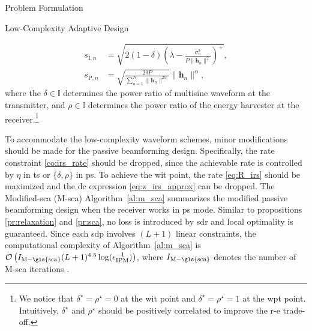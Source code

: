 \begin{section}{Problem Formulation}
\begin{subsection}{Low-Complexity Adaptive Design}
\begin{itemize}
\begin{align}
				s_{\mathrm{I}, n} &= \sqrt{2(1 - \delta)\left(\lambda - \frac{\sigma_n^2}{P \lVert{\mathbf{h}_n}\rVert^2}\right)^+}, \label{eq:s_i}\\
				s_{\mathrm{P}, n} &= \sqrt{\frac{2 \delta P}{\sum_{n=1}^N \lVert{\mathbf{h}_n \rVert^{2 \alpha}}}}\lVert{\mathbf{h}_n}\rVert^\alpha, \label{eq:s_p}
			\end{align}
			where the $\delta \in \mathbb{I}$ determines the power ratio of multisine waveform at the transmitter, and $\rho \in \mathbb{I}$ determines the power ratio of the energy harvester at the receiver.\footnote{We notice that $\delta^{\star}=\rho^{\star}=0$ at the \gls{wit} point and $\delta^{\star}=\rho^{\star}=1$ at the \gls{wpt} point. Intuitively, $\delta^{\star}$ and $\rho^{\star}$ should be positively correlated to improve the \gls{r-e} trade-off.}
		\end{itemize}

		To accommodate the low-complexity waveform schemes, minor modifications should be made for the passive beamforming design.
		Specifically, the rate constraint \eqref{co:irs_rate} should be dropped, since the achievable rate is controlled by $\eta$ in \gls{ts} or $\{\delta,\rho\}$ in \gls{ps}.
		To achieve the \gls{wit} point, the rate \eqref{eq:R_irs} should be maximized and the \gls{dc} expression \eqref{eq:z_irs_approx} can be dropped. The Modified-\gls{sca} (M-\gls{sca}) Algorithm~\ref{al:m_sca} summarizes the modified passive beamforming design when the receiver works in \gls{ps} mode.
		Similar to propositions \ref{pr:relaxation} and \ref{pr:sca}, no loss is introduced by \gls{sdr} and local optimality is guaranteed. Since each \gls{sdp} involves $(L+1)$ linear constraints, the computational complexity of Algorithm~\ref{al:m_sca} is $\mathcal{O}\left(I_{\mathrm{M-\gls{sca}}}(L+1)^{4.5} \log(\epsilon_{\mathrm{IPM}}^{-1})\right)$, where $I_{\mathrm{M-\gls{sca}}}$ denotes the number of M-\gls{sca} iterations \cite{Luo2010b}.


\end{subsection}
\end{section}
